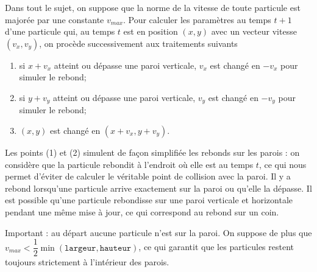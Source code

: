 \documentclass[10pt,fleqn]{article} %
\begin{document}
Dans tout le sujet, on suppose que la norme de la vitesse de toute particule est majorée par une constante $v_{max}$. Pour calculer les paramètres au temps $t+1$ d'une particule qui, au temps $t$ est en position $(x,y)$ avec un vecteur vitesse $(v_x,v_y)$, on procède successivement aux traitements suivants %
\begin{enumerate}
\item si $x+v_x$ atteint ou dépasse une paroi verticale, $v_x$ est changé en $-v_x$ pour simuler le rebond;
\item si $y+v_y$ atteint ou dépasse une paroi verticale, $v_y$ est changé en $-v_y$ pour simuler le rebond;
\item $(x,y)$ est changé en $(x+v_x,y+v_y)$. 
\end{enumerate}
Les points (1) et (2) simulent de façon simplifiée les rebonds sur les parois : on considère que la particule rebondit à l'endroit où elle est au temps $t$, ce qui nous permet d'éviter de calculer le véritable point de collision avec la paroi. Il y a rebond lorsqu'une particule arrive exactement sur la paroi ou qu'elle la dépasse. Il est possible qu'une particule rebondisse sur une paroi verticale et horizontale pendant une même mise à jour, ce qui correspond au rebond sur un coin.

\begin{rem}
Important : au départ aucune particule n'est sur la paroi. On suppose de plus que $v_{max}<\dfrac{1}{2}\min \left(\texttt{largeur},\texttt{hauteur}\right)$, ce qui garantit que les particules restent toujours strictement à l'intérieur des parois. 
\end{rem}
\end{document}
